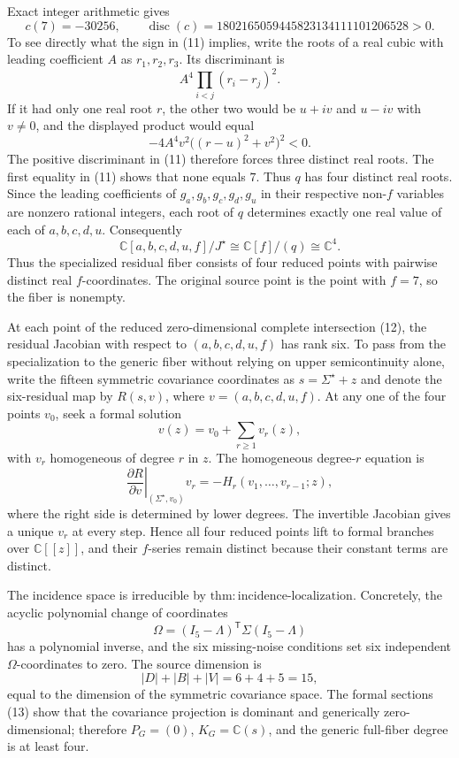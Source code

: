 Exact integer arithmetic gives
\[
 c(7)=-30256,
 \qquad
 \operatorname{disc}(c)
 =1802165059445823134111101206528>0.
 \tag{11}
\]
To see directly what the sign in (11) implies, write the roots of a real cubic with leading coefficient \(A\) as \(r_1,r_2,r_3\). Its discriminant is
\[
 A^4\prod_{i<j}(r_i-r_j)^2.
\]
If it had only one real root \(r\), the other two would be \(u+iv\) and \(u-iv\) with \(v\neq0\), and the displayed product would equal
\[
 -4A^4v^2\bigl((r-u)^2+v^2\bigr)^2<0.
\]
The positive discriminant in (11) therefore forces three distinct real roots. The first equality in (11) shows that none equals \(7\). Thus \(q\) has four distinct real roots. Since the leading coefficients of \(g_a,g_b,g_c,g_d,g_u\) in their respective non-\(f\) variables are nonzero rational integers, each root of \(q\) determines exactly one real value of each of \(a,b,c,d,u\). Consequently
\[
 \mathbb C[a,b,c,d,u,f]/J^{\star}
 \cong\mathbb C[f]/(q)
 \cong\mathbb C^4.
 \tag{12}
\]
Thus the specialized residual fiber consists of four reduced points with pairwise distinct real \(f\)-coordinates. The original source point is the point with \(f=7\), so the fiber is nonempty.

At each point of the reduced zero-dimensional complete intersection (12), the residual Jacobian with respect to \((a,b,c,d,u,f)\) has rank six. To pass from the specialization to the generic fiber without relying on upper semicontinuity alone, write the fifteen symmetric covariance coordinates as \(s=\Sigma^{\star}+z\) and denote the six-residual map by \(R(s,v)\), where \(v=(a,b,c,d,u,f)\). At any one of the four points \(v_0\), seek a formal solution
\[
 v(z)=v_0+\sum_{r\geq1}v_r(z),
\]
with \(v_r\) homogeneous of degree \(r\) in \(z\). The homogeneous degree-\(r\) equation is
\[
 \left.\frac{\partial R}{\partial v}\right|_{(\Sigma^{\star},v_0)}v_r
 =-H_r(v_1,\ldots,v_{r-1};z),
 \tag{13}
\]
where the right side is determined by lower degrees. The invertible Jacobian gives a unique \(v_r\) at every step. Hence all four reduced points lift to formal branches over \(\mathbb C[[z]]\), and their \(f\)-series remain distinct because their constant terms are distinct.

The incidence space is irreducible by \(\mathrm{thm:incidence\mbox{-}localization}\). Concretely, the acyclic polynomial change of coordinates
\[
 \Omega=(I_5-\Lambda)^{\mathsf T}\Sigma(I_5-\Lambda)
\]
has a polynomial inverse, and the six missing-noise conditions set six independent \(\Omega\)-coordinates to zero. The source dimension is
\[
 |D|+|B|+|V|=6+4+5=15,
\]
equal to the dimension of the symmetric covariance space. The formal sections (13) show that the covariance projection is dominant and generically zero-dimensional; therefore \(P_G=(0)\), \(K_G=\mathbb C(s)\), and the generic full-fiber degree is at least four.

